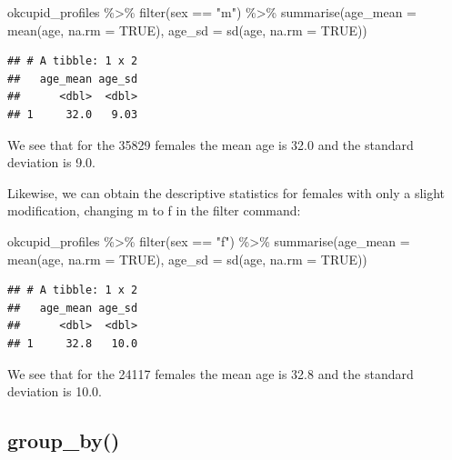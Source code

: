 \documentclass[
]{krantz}
\makeatletter
\newenvironment{Shaded}{\begin{snugshade}}{\end{snugshade}}
\newcommand{\AttributeTok}[1]{\textcolor[rgb]{0.61,0.61,0.61}{#1}}
\newcommand{\ConstantTok}[1]{\textcolor[rgb]{0,0,0}{#1}}
\newcommand{\FunctionTok}[1]{\textcolor[rgb]{0,0,0}{#1}}
\newcommand{\NormalTok}[1]{#1}
\newcommand{\SpecialCharTok}[1]{\textcolor[rgb]{0,0,0}{#1}}
\newcommand{\StringTok}[1]{\textcolor[rgb]{0.5,0.5,0.5}{#1}}
\newenvironment{kframe}{%
\medskip{}
\setlength{\fboxsep}{.8em}
 \def\at@end@of@kframe{}%
 \ifinner\ifhmode%
  \def\at@end@of@kframe{\end{minipage}}%
  \begin{minipage}{\columnwidth}%
 \fi\fi%
 \def\FrameCommand##1{\hskip\@totalleftmargin \hskip-\fboxsep
 \colorbox{shadecolor}{##1}\hskip-\fboxsep
     \hskip-\linewidth \hskip-\@totalleftmargin \hskip\columnwidth}%
 \MakeFramed {\advance\hsize-\width
   \@totalleftmargin\z@ \linewidth\hsize
   \@setminipage}}%
 {\par\unskip\endMakeFramed%
 \at@end@of@kframe}
\renewenvironment{Shaded}{\begin{kframe}}{\end{kframe}}
\makeatother
\begin{document}
\begin{Shaded}
\begin{Highlighting}[]
\NormalTok{okcupid\_profiles }\SpecialCharTok{\%\textgreater{}\%}
  \FunctionTok{filter}\NormalTok{(sex }\SpecialCharTok{==} \StringTok{"m"}\NormalTok{) }\SpecialCharTok{\%\textgreater{}\%}
  \FunctionTok{summarise}\NormalTok{(}\AttributeTok{age\_mean =} \FunctionTok{mean}\NormalTok{(age, }\AttributeTok{na.rm =} \ConstantTok{TRUE}\NormalTok{),}
            \AttributeTok{age\_sd =} \FunctionTok{sd}\NormalTok{(age, }\AttributeTok{na.rm =} \ConstantTok{TRUE}\NormalTok{))}
\end{Highlighting}
\end{Shaded}

\begin{verbatim}
## # A tibble: 1 x 2
##   age_mean age_sd
##      <dbl>  <dbl>
## 1     32.0   9.03
\end{verbatim}

We see that for the 35829 females the mean age is 32.0 and the standard deviation is 9.0.

Likewise, we can obtain the descriptive statistics for females with only a slight modification, changing m to f in the filter command:

\begin{Shaded}
\begin{Highlighting}[]
\NormalTok{okcupid\_profiles }\SpecialCharTok{\%\textgreater{}\%}
  \FunctionTok{filter}\NormalTok{(sex }\SpecialCharTok{==} \StringTok{"f"}\NormalTok{) }\SpecialCharTok{\%\textgreater{}\%}
  \FunctionTok{summarise}\NormalTok{(}\AttributeTok{age\_mean =} \FunctionTok{mean}\NormalTok{(age, }\AttributeTok{na.rm =} \ConstantTok{TRUE}\NormalTok{),}
            \AttributeTok{age\_sd =} \FunctionTok{sd}\NormalTok{(age, }\AttributeTok{na.rm =} \ConstantTok{TRUE}\NormalTok{))}
\end{Highlighting}
\end{Shaded}

\begin{verbatim}
## # A tibble: 1 x 2
##   age_mean age_sd
##      <dbl>  <dbl>
## 1     32.8   10.0
\end{verbatim}

We see that for the 24117 females the mean age is 32.8 and the standard deviation is 10.0.

\hypertarget{group_by}{%
\subsection{group\_by()}\label{group_by}}
\end{document}
